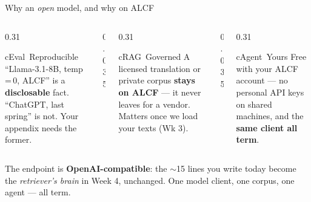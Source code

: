 \begin{frame}{Why an \emph{open} model, and why on ALCF}
  \begin{columns}[t, totalwidth=\textwidth]
    \begin{column}{0.31\textwidth}
      \begin{featbox}{cEval}{\faClipboardCheck\ Reproducible}
        \scriptsize ``Llama-3.1-8B, temp\,=\,0, ALCF'' is a \textbf{disclosable}
        fact. ``ChatGPT, last spring'' is not. Your appendix needs the former.
      \end{featbox}
    \end{column}
    \begin{column}{0.035\textwidth}\end{column}
    \begin{column}{0.31\textwidth}
      \begin{featbox}{cRAG}{\faLock\ Governed}
        \scriptsize A licensed translation or private corpus \textbf{stays on ALCF} ---
        it never leaves for a vendor. Matters once we load your texts (Wk 3).
      \end{featbox}
    \end{column}
    \begin{column}{0.035\textwidth}\end{column}
    \begin{column}{0.31\textwidth}
      \begin{featbox}{cAgent}{\faKey\ Yours}
        \scriptsize Free with your ALCF account --- no personal API keys on shared
        machines, and the \textbf{same client all term}.
      \end{featbox}
    \end{column}
  \end{columns}
  \vspace{12pt}
  \begin{center}
  \begin{minipage}{0.9\textwidth}\small
    The endpoint is \textbf{OpenAI-compatible}: the $\sim$15 lines you write today become
    the \emph{retriever's brain} in Week 4, unchanged. One model client, one corpus, one
    agent --- all term.
  \end{minipage}
  \end{center}
\end{frame}

